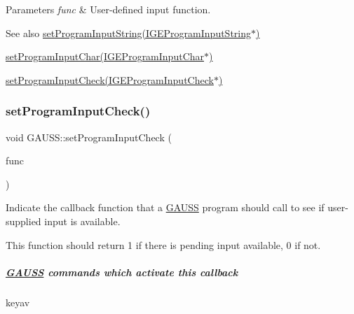 \begin{DoxyParams}{Parameters}
{\em func} & User-\/defined input function.\\
\hline
\end{DoxyParams}
\begin{DoxySeeAlso}{See also}
\hyperlink{class_g_a_u_s_s_ae82b5bfdf26971433c46936a812506c3}{set\+Program\+Input\+String(\+I\+G\+E\+Program\+Input\+String$\ast$)} 

\hyperlink{class_g_a_u_s_s_a71a60afb143ae00b18d6fe3fd99f316d}{set\+Program\+Input\+Char(\+I\+G\+E\+Program\+Input\+Char$\ast$)} 

\hyperlink{class_g_a_u_s_s_a6517b404cf71d157808a1cb73e3c0ddb}{set\+Program\+Input\+Check(\+I\+G\+E\+Program\+Input\+Check$\ast$)} 
\end{DoxySeeAlso}
\mbox{\label{class_g_a_u_s_s_a6517b404cf71d157808a1cb73e3c0ddb}} 
\subsubsection{\texorpdfstring{set\+Program\+Input\+Check()}{setProgramInputCheck()}}
{\footnotesize\ttfamily void G\+A\+U\+S\+S\+::set\+Program\+Input\+Check (\begin{DoxyParamCaption}\item[{\hyperlink{class_i_g_e_program_input_check}{I\+G\+E\+Program\+Input\+Check} $\ast$}]{func }\end{DoxyParamCaption})\hspace{0.3cm}{\ttfamily [static]}}



Indicate the callback function that a \hyperlink{class_g_a_u_s_s}{G\+A\+U\+SS} program should call to see if user-\/supplied input is available. 

This function should return 1 if there is pending input available, 0 if not.

\subparagraph*{\hyperlink{class_g_a_u_s_s}{G\+A\+U\+SS} commands which activate this callback}


\begin{DoxyItemize}
\item {\ttfamily keyav}
\end{DoxyItemize}

